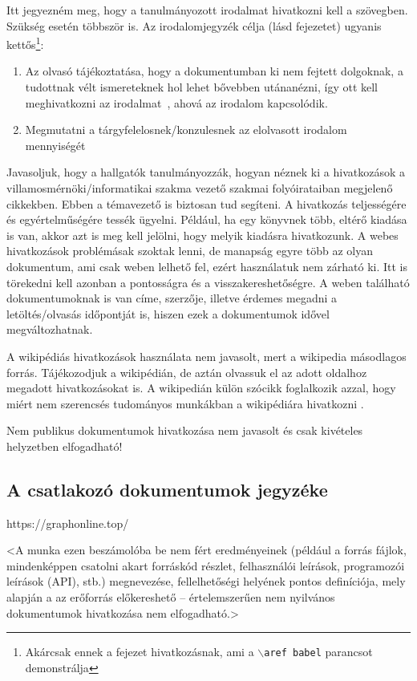 \documentclass[a4paper,oneside]{article}
\begin{document}
Itt jegyezném meg, hogy a tanulmányozott irodalmat hivatkozni kell a
szövegben.  Szükség esetén többször is.  Az irodalomjegyzék célja
(lásd  fejezetet) ugyanis
kettős\footnote{Akárcsak ennek a fejezet hivatkozásnak, ami a
  \texttt{$\backslash$aref babel} parancsot demonstrálja}:
\begin{enumerate}
\item Az olvasó tájékoztatása, hogy a dokumentumban ki nem fejtett
  dolgoknak, a tudottnak vélt ismereteknek hol lehet bővebben
  utánanézni, így ott kell meghivatkozni az irodalmat~\cite{eco,
    esterhazy}, ahová az irodalom kapcsolódik.
\item Megmutatni a tárgyfelelosnek/konzulesnek az elolvasott irodalom
  mennyiségét
\end{enumerate}

Javasoljuk, hogy a hallgatók tanulmányozzák, hogyan néznek ki a
hivatkozások a villamosmérnöki/informatikai szakma vezető szakmai
folyóirataiban megjelenő cikkekben.  Ebben a témavezető is biztosan
tud segíteni.  A hivatkozás teljességére és egyértelműségére tessék
ügyelni.  Például, ha egy könyvnek több, eltérő kiadása is van, akkor
azt is meg kell jelölni, hogy melyik kiadásra hivatkozunk.  A webes
hivatkozások problémásak szoktak lenni, de manapság egyre több az
olyan dokumentum, ami csak weben lelhető fel, ezért használatuk nem
zárható ki. Itt is törekedni kell azonban a pontosságra és a
visszakereshetőségre. A weben található dokumentumoknak is van címe,
szerzője, illetve érdemes megadni a letöltés/olvasás időpontját is,
hiszen ezek a dokumentumok idővel megváltozhatnak.

A wikipédiás hivatkozások használata nem javasolt, mert a wikipedia
másodlagos forrás.  Tájékozodjuk a wikipédián, de aztán olvassuk el az
adott oldalhoz megadott hivatkozásokat is.  A wikipedián külön szócikk
foglalkozik azzal, hogy miért nem szerencsés tudományos munkákban a
wikipédiára hivatkozni \cite{wikipedia}.

Nem publikus dokumentumok hivatkozása nem javasolt és csak kivételes
helyzetben elfogadható!

\subsection{A csatlakozó dokumentumok jegyzéke}
\label{sec:csat-irod}

https://graphonline.top/

<A munka ezen beszámolóba be nem fért eredményeinek (például a forrás
fájlok, mindenképpen csatolni akart forráskód részlet, felhasználói
leírások, programozói leírások (API), stb.) megnevezése,
fellelhetőségi helyének pontos definíciója, mely alapján a az
erőforrás előkereshető -- értelemszerűen nem nyilvános dokumentumok
hivatkozása nem elfogadható.>
\end{document}
